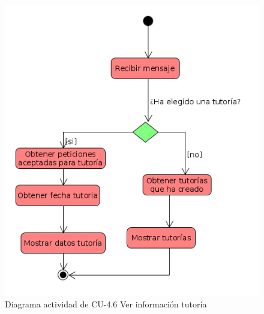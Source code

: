         \begin{figure}[H] %
\centering
\includegraphics[scale=0.5]{imagenes/diagramas/actividad/cola_tutorias.png}  %

\caption{Diagrama actividad  de CU-4.6 Ver información tutoría}\label{figura145}
\end{figure}



